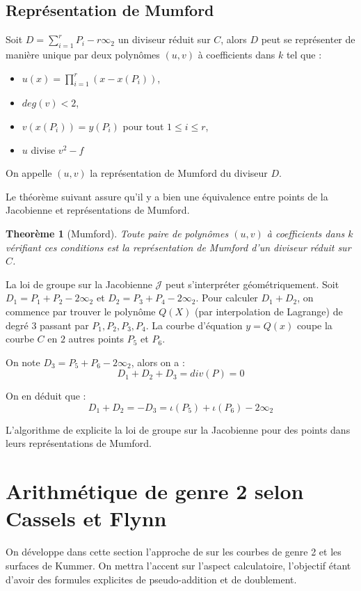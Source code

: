 \documentclass[a4paper]{article}
\newtheorem{theoreme}{Theorème}[section]
\theoremstyle{definition}
\theoremstyle{remark}
\numberwithin{equation}{section}
\begin{document}
\subsection{Représentation de Mumford}
Soit $D = \sum_{i=1}^r{P_i} - r\infty_2$ un diviseur réduit sur $C$, alors $D$ peut se représenter de manière unique par deux polynômes $(u,v)$ à coefficients dans $k$ tel que :
\begin{itemize}
\item $u(x) =  \prod_{i=1}^r (x - x(P_i) )$,
\item $deg(v) < 2$,
\item $v(x(P_i)) = y(P_i)$ pour tout $1 \leq i \leq r$,
\item $u$ divise $v^2 - f$
\end{itemize}
On appelle $(u,v)$ la représentation de Mumford du diviseur $D$.

Le théorème suivant assure qu'il y a bien une équivalence entre points de la Jacobienne et représentations de Mumford.

\begin{theoreme}[Mumford]
Toute paire de polynômes $(u,v)$ à coefficients dans $k$ vérifiant ces conditions est la représentation de Mumford d'un diviseur réduit sur $C$.
\end{theoreme}

La loi de groupe sur la Jacobienne $\mathcal{J}$ peut s'interpréter géométriquement. Soit $D_1 = P_1 + P_2 - 2\infty_2$ et $D_2 = P_3 + P_4 - 2\infty_2$. Pour calculer $D_1 + D_2$, on commence par trouver le polynôme $Q(X)$ (par interpolation de Lagrange) de degré $3$ passant par $P_1,P_2,P_3,P_4$. La courbe d'équation $y = Q(x)$ coupe la courbe $C$ en $2$ autres points $P_5$ et $P_6$.

On note $D_3 = P_5 + P_6 - 2\infty_2$, alors on a :
$$D_1 + D_2 + D_3 = div(P) = 0$$

On en déduit que :
$$D_1 + D_2 = -D_3 = \iota(P_5) + \iota(P_6) - 2\infty_2$$

L'algorithme de \citet{cantor} explicite la loi de groupe sur la Jacobienne pour des points dans leurs représentations de Mumford.

\section{Arithmétique de genre 2 selon Cassels et Flynn}
On développe dans cette section l'approche de \citet{cassels-Flynn} sur les courbes de genre 2 et les surfaces de Kummer. On mettra l'accent sur l'aspect calculatoire, l'objectif étant d'avoir des formules explicites de pseudo-addition et de doublement.
\end{document}
